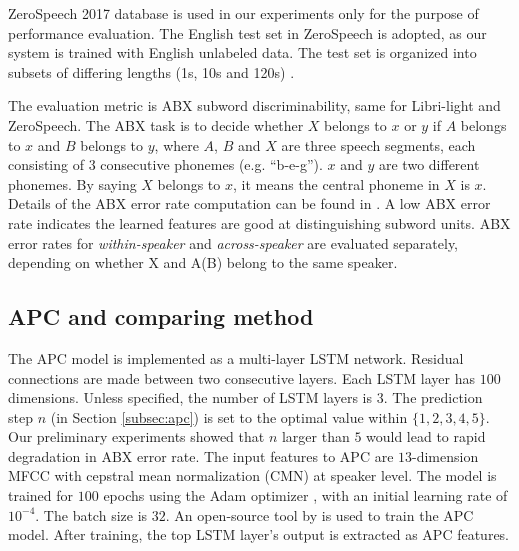 \documentclass[a4paper]{article}
\newcommand{\quotes}[1]{``#1''}
\begin{document}
ZeroSpeech 2017 database is   used in our experiments only for the purpose of performance evaluation. The English test set in ZeroSpeech is adopted, as our system is trained with English unlabeled data. 
The test set is organized into subsets of differing   lengths (1s, 10s and 120s)  \cite{dunbar2017zero}.


The evaluation metric is  ABX subword discriminability, same for    Libri-light and ZeroSpeech.
The ABX task is to decide whether $X$ belongs to $x$ or $y$ if $A$ belongs to $x$ and $B$ belongs to $y$, where $A$, $B$ and $X$ are three speech segments, each consisting of $3$ consecutive phonemes (e.g. \quotes{b-e-g}). $x$ and $y$ are two different phonemes. By saying $X$ belongs to $x$, it means the central phoneme in $X$ is $x$. 
Details of the ABX error rate computation can be found in \cite{dunbar2017zero}. A low ABX error rate indicates the learned features are good at distinguishing subword units. ABX error rates for \textit{within-speaker} and \textit{across-speaker} are evaluated separately, depending
on whether X and A(B) belong to the same speaker.
\subsection{APC and comparing method}
The APC model is implemented as a  multi-layer  LSTM network. Residual connections are made between two consecutive layers.  
Each LSTM layer has $100$ dimensions.
Unless specified, the number of LSTM layers is $3$.
The prediction step $n$ (in Section \ref{subsec:apc}) is set to  the optimal value within $\{1,2,3,4,5\}$. Our preliminary experiments showed that $n$ larger than $5$ would lead to rapid degradation in ABX error rate. 
The input features to APC are $13$-dimension MFCC with cepstral mean normalization (CMN) at speaker level. 
The model is trained for $100$ epochs using the Adam optimizer \cite{kingma2014adam}, with an initial learning rate of $10^{-4}$. The batch size is  $32$. An open-source tool by \cite{Chung2019} is used to train the APC model. 
After training, the top LSTM layer's output is extracted as APC features.
\end{document}
